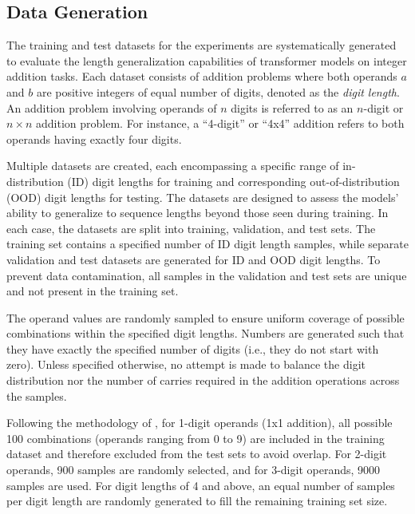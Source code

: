 

\subsection{Data Generation}\label{subsec:data_gen}

The training and test datasets for the experiments are systematically generated to evaluate the length generalization capabilities of transformer models on integer addition tasks. Each dataset consists of addition problems where both operands \( a \) and \( b \) are positive integers of equal number of digits, denoted as the \emph{digit length}. An addition problem involving operands of \( n \) digits is referred to as an \( n \)-digit or \( n \times n \) addition problem. For instance, a ``4-digit'' or ``4x4'' addition refers to both operands having exactly four digits.

Multiple datasets are created, each encompassing a specific range of in-distribution (ID) digit lengths for training and corresponding out-of-distribution (OOD) digit lengths for testing. The datasets are designed to assess the models' ability to generalize to sequence lengths beyond those seen during training. In each case, the datasets are split into training, validation, and test sets. The training set contains a specified number of ID digit length samples, while separate validation and test datasets are generated for ID and OOD digit lengths. To prevent data contamination, all samples in the validation and test sets are unique and not present in the training set.

The operand values are randomly sampled to ensure uniform coverage of possible combinations within the specified digit lengths. Numbers are generated such that they have exactly the specified number of digits (i.e., they do not start with zero). Unless specified otherwise, no attempt is made to balance the digit distribution nor the number of carries required in the addition operations across the samples.

Following the methodology of \cite{lee_teaching_2023}, for 1-digit operands (1x1 addition), all possible 100 combinations (operands ranging from 0 to 9) are included in the training dataset and therefore excluded from the test sets to avoid overlap. For 2-digit operands, 900 samples are randomly selected, and for 3-digit operands, 9000 samples are used. For digit lengths of 4 and above, an equal number of samples per digit length are randomly generated to fill the remaining training set size.

